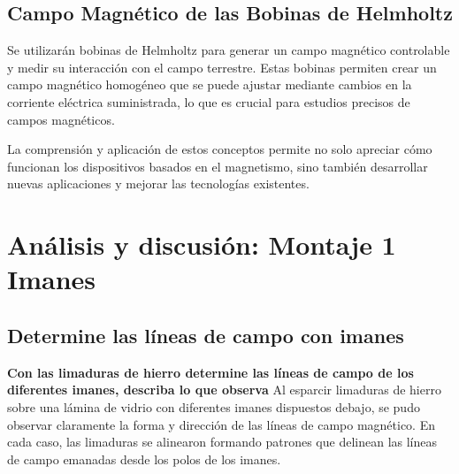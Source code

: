 \subsection{Campo Magnético de las Bobinas de Helmholtz}
Se utilizarán bobinas de Helmholtz para generar un campo magnético controlable y medir su interacción con el campo terrestre. Estas bobinas permiten crear un campo magnético homogéneo que se puede ajustar mediante cambios en la corriente eléctrica suministrada, lo que es crucial para estudios precisos de campos magnéticos.

La comprensión y aplicación de estos conceptos permite no solo apreciar cómo funcionan los dispositivos basados en el magnetismo, sino también desarrollar nuevas aplicaciones y mejorar las tecnologías existentes.

\section{Análisis y discusión: Montaje 1 Imanes}

\subsection{Determine las líneas de campo con imanes}
\textbf{Con las limaduras de hierro determine las líneas de campo de los diferentes imanes,
describa lo que observa}
Al esparcir limaduras de hierro sobre una lámina de vidrio con diferentes imanes dispuestos debajo, se pudo observar claramente la forma y dirección de las líneas de campo magnético. En cada caso, las limaduras se alinearon formando patrones que delinean las líneas de campo emanadas desde los polos de los imanes.

